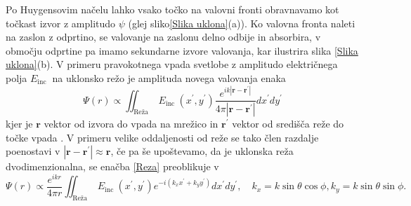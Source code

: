 \documentclass[12pt ]{article}
\begin{document}
Po Huygensovim načelu lahko vsako točko na valovni fronti obravnavamo kot točkast izvor z amplitudo $\psi$ (glej sliko\ref{Slika uklona}(a)). Ko valovna fronta naleti na zaslon z odprtino, se valovanje na zaslonu delno odbije in absorbira, v območju odprtine pa imamo sekundarne izvore valovanja, kar ilustrira slika \ref{Slika uklona}(b). V primeru pravokotnega vpada svetlobe z amplitudo električnega polja $E_{\text {inc }}$ na uklonsko režo je amplituda novega valovanja enaka
\begin{equation}
\Psi(r) \propto \iint_{\text {Reža }} E_{\text {inc }}\left(x^{\prime}, y^{\prime}\right) \frac{e^{i k\left|\mathbf{r}-\mathbf{r}^{\prime}\right|}}{4 \pi\left|\mathbf{r}-\mathbf{r}^{\prime}\right|} d x^{\prime} d y^{\prime}
\label{Reza}
\end{equation}
kjer je $\mathbf{r}$ vektor od izvora do vpada na mrežico in $\mathbf{r}^{\prime}$ vektor od središča reže do točke vpada \cite{Praktikum4}. V primeru velike oddaljenosti od reže se tako člen razdalje poenostavi v $\left|\mathbf{r}-\mathbf{r}^{\prime}\right| \approx \mathbf{r}$, če pa še upoštevamo, da je uklonska reža dvodimenzionalna, se enačba \eqref{Reza} preoblikuje v
\begin{equation*}
\Psi(r) \propto \frac{e^{i k r}}{4 \pi r} \iint_{\text {Reža }} E_{\text {inc }}\left(x^{\prime}, y^{\prime}\right) e^{-i\left(k_{x} x^{\prime}+k_{y} y^{\prime}\right)} d x^{\prime} d y^{\prime}, \quad 
k_{x}=k \sin \theta \cos \phi,
k_{y}=k \sin \theta \sin \phi.
\end{equation*}
\end{document}
